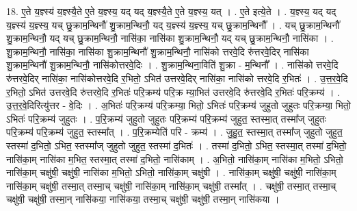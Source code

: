 \documentclass[17pt]{extarticle}
\begin{document}
18. ए॒ते य॒ज्ञ्स्य॑ य॒ज्ञ्स्यै॒ते ए॒ते य॒ज्ञ्स्य॒ यद् यद् य॒ज्ञ्स्यै॒ते ए॒ते य॒ज्ञ्स्य॒ यत् । . ए॒ते इत्ये॒ते । . य॒ज्ञ्स्य॒ यद् यद् य॒ज्ञ्स्य॑ य॒ज्ञ्स्य॒ यच् छु॒क्राम॒न्थिनौ॑ शु॒क्राम॒न्थिनौ॒ यद् य॒ज्ञ्स्य॑ य॒ज्ञ्स्य॒ यच् छु॒क्राम॒न्थिनौ᳚ । . यच् छु॒क्राम॒न्थिनौ॑ शु॒क्राम॒न्थिनौ॒ यद् यच् छु॒क्राम॒न्थिनौ॒ नासि॑का॒ नासि॑का शु॒क्राम॒न्थिनौ॒ यद् यच् छु॒क्राम॒न्थिनौ॒ नासि॑का । . शु॒क्राम॒न्थिनौ॒ नासि॑का॒ नासि॑का शु॒क्राम॒न्थिनौ॑ शु॒क्राम॒न्थिनौ॒ नासि॑को त्तरवे॒दि रु॑त्तरवे॒दिर् नासि॑का शु॒क्राम॒न्थिनौ॑ शु॒क्राम॒न्थिनौ॒ नासि॑कोत्तरवे॒दिः । . शु॒क्राम॒न्थिना॒विति॑ शु॒क्रा - म॒न्थिनौ᳚ । . नासि॑को त्तरवे॒दि रु॑त्तरवे॒दिर् नासि॑का॒ नासि॑कोत्तरवे॒दि र॒भितो॒ ऽभित॑ उत्तरवे॒दिर् नासि॑का॒ नासि॑को त्तरवे॒दि र॒भितः॑ । . उ॒त्त॒र॒वे॒दि र॒भितो॒ ऽभित॑ उत्तरवे॒दि रु॑त्तरवे॒दि र॒भितः॑ परि॒क्रम्य॑ परि॒क्र म्या॒भित॑ उत्तरवे॒दि रु॑त्तरवे॒दि र॒भितः॑ परि॒क्रम्य॑ । . उ॒त्त॒र॒वे॒दिरित्यु॑त्तर - वे॒दिः । . अ॒भितः॑ परि॒क्रम्य॑ परि॒क्रम्या॒ भितो॒ ऽभितः॑ परि॒क्रम्य॑ जुहुतो जुहुतः परि॒क्रम्या॒ भितो॒ ऽभितः॑ परि॒क्रम्य॑ जुहुतः । . प॒रि॒क्रम्य॑ जुहुतो जुहुतः परि॒क्रम्य॑ परि॒क्रम्य॑ जुहुत॒ स्तस्मा॒त् तस्मा᳚ज् जुहुतः परि॒क्रम्य॑ परि॒क्रम्य॑ जुहुत॒ स्तस्मा᳚त् । . प॒रि॒क्रम्येति॑ परि - क्रम्य॑ । . जु॒हु॒त॒ स्तस्मा॒त् तस्मा᳚ज् जुहुतो जुहुत॒ स्तस्मा॑ द॒भितो॒ ऽभित॒ स्तस्मा᳚ज् जुहुतो जुहुत॒ स्तस्मा॑ द॒भितः॑ । . तस्मा॑ द॒भितो॒ ऽभित॒ स्तस्मा॒त् तस्मा॑ द॒भितो॒ नासि॑का॒म् नासि॑का म॒भित॒ स्तस्मा॒त् तस्मा॑ द॒भितो॒ नासि॑काम् । . अ॒भितो॒ नासि॑का॒म् नासि॑का म॒भितो॒ ऽभितो॒ नासि॑का॒म् चक्षु॑षी॒ चक्षु॑षी॒ नासि॑का म॒भितो॒ ऽभितो॒ नासि॑का॒म् चक्षु॑षी । . नासि॑का॒म् चक्षु॑षी॒ चक्षु॑षी॒ नासि॑का॒म् नासि॑का॒म् चक्षु॑षी॒ तस्मा॒त् तस्मा॒च् चक्षु॑षी॒ नासि॑का॒म् नासि॑का॒म् चक्षु॑षी॒ तस्मा᳚त् । . चक्षु॑षी॒ तस्मा॒त् तस्मा॒च् चक्षु॑षी॒ चक्षु॑षी॒ तस्मा॒न् नासि॑कया॒ नासि॑कया॒ तस्मा॒च् चक्षु॑षी॒ चक्षु॑षी॒ तस्मा॒न् नासि॑कया । \newline
\end{document}
